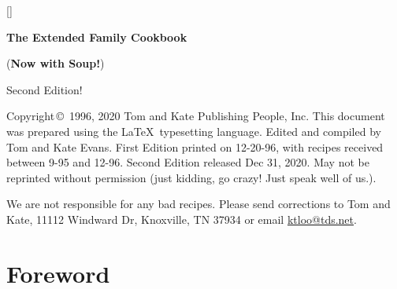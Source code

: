 \documentclass[12pt]{article}
\begin{document}

\titleformat{\section}{\Large\bfseries}{\thesection}{1em}{}[]

\begin{titlepage}
\vspace*{1.5in}
\begin{center}
\begin{Huge}
\vspace{2\baselineskip}
{\bf The Extended Family Cookbook}\\
\end{Huge}
\begin{huge}
\vspace{\baselineskip}
({\bf Now with Soup!})\\
\end{huge}
\begin{LARGE}
\vspace{3\baselineskip}
Second Edition!
\end{LARGE}
\end{center}
\end{titlepage}

\vspace*{\fill}
Copyright\,\copyright\, 1996, 2020 Tom and Kate Publishing People, Inc.
This document was prepared using the \LaTeX\ typesetting language.
Edited and compiled by Tom and Kate Evans.
First Edition printed on 12-20-96, with recipes received between 9-95 and
12-96.
Second Edition released Dec 31, 2020.
May not be reprinted without permission (just kidding, go crazy! Just speak well of us.).

\vspace{1\baselineskip}
We are not responsible for any bad recipes. Please send corrections to Tom and Kate, 11112 Windward Dr, Knoxville, TN 37934 or email \href{mailto:ktloo@tds.net}{ktloo@tds.net}.
\pagebreak

\pagestyle{headings}
\tableofcontents

\clearpage
\section*{Foreword}
\end{document}
